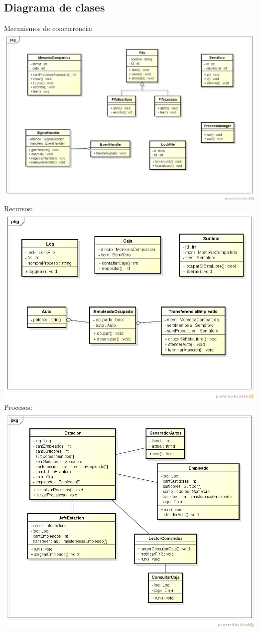 \documentclass{article}
\begin{document}
\subsection{Diagrama de clases}
Mecanismos de concurrencia:
\\[1\baselineskip]
\includegraphics[width=\textwidth]{clasesConcurrencia1}
Recursos:
\\[1\baselineskip]
\includegraphics[width=\textwidth]{clasesConcurrencia2}
Procesos:
\\[1\baselineskip]
\includegraphics[width=\textwidth]{clasesConcurrencia3}
\end{document}
